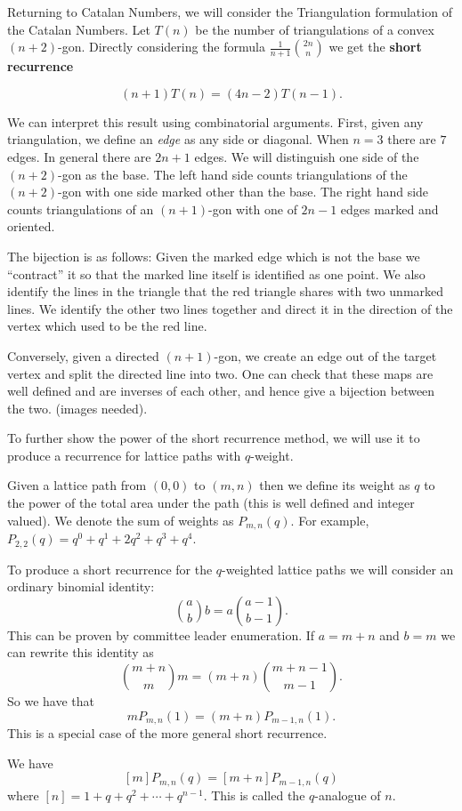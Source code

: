Returning to Catalan Numbers, we will consider the Triangulation formulation of the Catalan Numbers. Let $T(n)$ be the number of triangulations of a convex $(n + 2)$-gon. Directly considering the formula $\frac{1}{n+1}\binom{2n}{n}$ we get the \textbf{short recurrence}

\[(n + 1)T(n) = (4n - 2)T(n-1).\]

We can interpret this result using combinatorial arguments. First, given any triangulation, we define an \textit{edge} as any side or diagonal. When $n = 3$ there are $7$ edges. In general there are $2n + 1$ edges. We will distinguish one side of the $(n + 2)$-gon as the base. The left hand side counts triangulations of the $(n + 2)$-gon with one side marked other than the base. The right hand side counts triangulations of an $(n + 1)$-gon with one of $2n - 1$ edges marked and oriented.

The bijection is as follows: Given the marked edge which is not the base we ``contract'' it so that the marked line itself is identified as one point. We also identify the lines in the triangle that the red triangle shares with two unmarked lines. We identify the other two lines together and direct it in the direction of the vertex which used to be the red line.

Conversely, given a directed $(n+1)$-gon, we create an edge out of the target vertex and split the directed line into two. One can check that these maps are well defined and are inverses of each other, and hence give a bijection between the two. (images needed).

To further show the power of the short recurrence method, we will use it to produce a recurrence for lattice paths with $q$-weight.

Given a lattice path from $(0, 0)$ to $(m, n)$ then we define its weight as $q$ to the power of the total area under the path (this is well defined and integer valued). We denote the sum of weights as $P_{m, n}(q)$. For example, $P_{2,2}(q) = q^0 + q^1 + 2q^2 + q^3 + q^4$. 

To produce a short recurrence for the $q$-weighted lattice paths we will consider an ordinary binomial identity:
\[\binom{a}{b}b = a\binom{a-1}{b-1}.\] This can be proven by committee leader enumeration. If $a = m + n$ and $b = m$ we can rewrite this identity as
\[\binom{m + n}{m}m = (m + n)\binom{m + n - 1}{m - 1}.\]
So we have that
\[mP_{m, n}(1) = (m + n)P_{m-1, n}(1).\]
This is a special case of the more general short recurrence.
\begin{theorem}
We have 
\[[m]P_{m, n}(q) = [m + n]P_{m-1, n}(q)\]
where $[n] = 1 + q + q^2 + \cdots + q^{n-1}$.
This is called the $q$-analogue of $n$.
\end{theorem}

